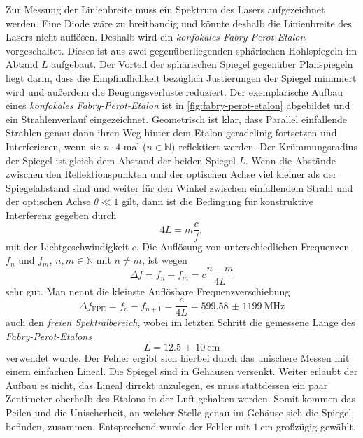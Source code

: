 \documentclass[../bericht.tex]{subfiles}
\begin{document}
        Zur Messung der Linienbreite muss ein Spektrum des Lasers aufgezeichnet werden. Eine Diode w\"are zu breitbandig und k\"onnte deshalb die Linienbreite des Lasers nicht aufl\"osen. Deshalb wird ein \textit{konfokales Fabry-Perot-Etalon} vorgeschaltet. Dieses ist aus zwei gegen\"uberliegenden sph\"arischen Hohlspiegeln im Abtand $L$ aufgebaut. Der Vorteil der sph\"arischen Spiegel gegen\"uber Planspiegeln liegt darin, dass die Empfindlichkeit bez\"uglich Justierungen der Spiegel minimiert wird und außerdem die Beugungsverluste reduziert. Der exemplarische Aufbau eines \textit{konfokales Fabry-Perot-Etalon} ist in \cref{fig:fabry-perot-etalon} abgebildet und ein Strahlenverlauf eingezeichnet. Geometrisch ist klar, dass Parallel einfallende Strahlen genau dann ihren Weg hinter dem Etalon geradelinig fortsetzen und Interferieren, wenn sie $n\cdot 4$-mal ($n\in\mathbb{N}$) reflektiert werden. Der Kr\"ummungsradius der Spiegel ist gleich dem Abstand der beiden Spiegel $L$. Wenn die Abst\"ande zwischen den Reflektionspunkten und der optischen Achse viel kleiner als der Spiegelabstand sind und weiter f\"ur den Winkel zwischen einfallendem Strahl und der optischen Achse $\theta \ll 1$ gilt, dann ist die Bedingung f\"ur konstruktive Interferenz gegeben durch
        \begin{equation*}
          4L = m \frac{c}{f},
        \end{equation*}
        mit der Lichtgeschwindigkeit $c$. Die Aufl\"osung von unterschiedlichen Frequenzen $f_n$ und $f_m$, $n,m\in\mathbb{N}$ mit $n\ne m $, ist wegen
        \begin{equation*}
          \Delta f= f_n -f_m =c \frac{n-m}{4L}
        \end{equation*}
        sehr gut. Man nennt die kleinste Aufl\"osbare Frequenzverschiebung
        \begin{equation}
          \Delta f_\mathrm{FPE} = f_n - f_{n+1} = \frac{c}{4L} = \SI{599,58(1199)}{\mega\hertz}
          \label{eq:freier-spektralbereich}
        \end{equation}
        auch den \textit{freien Spektralbereich}, wobei im letzten Schritt die gemessene L\"ange des \textit{Fabry-Perot-Etalons}
        \begin{equation*}
          L=\SI{12,5(10)}{\centi\meter}
        \end{equation*}
        verwendet wurde. Der Fehler ergibt sich hierbei durch das unischere Messen mit einem einfachen Lineal. Die Spiegel sind in Geh\"ausen versenkt. Weiter erlaubt der Aufbau es nicht, das Lineal dirrekt anzulegen, es muss stattdessen ein paar Zentimeter oberhalb des Etalons in der Luft gehalten werden. Somit kommen das Peilen und die Unischerheit, an welcher Stelle genau im Geh\"ause sich die Spiegel befinden, zusammen. Entsprechend wurde der Fehler mit $\SI{1}{\centi\meter}$ großz\"ugig gew\"ahlt.
\end{document}
